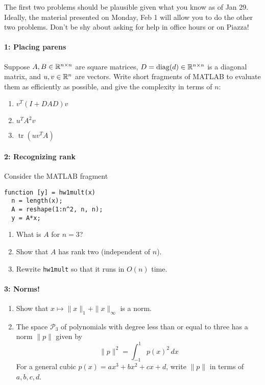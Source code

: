 \documentclass[12pt, leqno]{article}
\begin{document}

The first two problems should be plausible given what you know as of
Jan 29.  Ideally, the material presented on Monday, Feb 1 will allow
you to do the other two problems.  Don't be shy about asking for help
in office hours or on Piazza!

\paragraph*{1: Placing parens}
Suppose $A, B \in \mathbb{R}^{n \times n}$ are square matrices,
$D = \operatorname{diag}(d) \in \mathbb{R}^{n \times n}$ is a diagonal matrix,
and $u, v \in \mathbb{R}^n$ are vectors.  Write short
fragments of MATLAB to evaluate them as efficiently
as possible, and give the complexity in terms of $n$:
\begin{enumerate}
\item $v^T (I + D A D) v$
\item $u^T A^2 v$
\item $\operatorname{tr}(uv^T A)$
\end{enumerate}

\paragraph*{2: Recognizing rank}
Consider the MATLAB fragment

\lstset{language=matlab,frame=lines,columns=flexible}
\begin{lstlisting}
function [y] = hw1mult(x)
  n = length(x);
  A = reshape(1:n^2, n, n);
  y = A*x;
\end{lstlisting}

\begin{enumerate}
\item What is $A$ for $n = 3$?
\item Show that $A$ has rank two (independent of $n$).
\item Rewrite {\tt hw1mult} so that it runs in $O(n)$ time.
\end{enumerate}

\paragraph*{3: Norms!}
\begin{enumerate}
\item
  Show that $x \mapsto \|x\|_1 + \|x\|_\infty$ is a norm.
\item
  The space $\mathcal{P}_3$ of polynomials with degree less than or
  equal to three has a norm $\|p\|$ given by
  \[
    \|p\|^2 = \int_{-1}^1 p(x)^2 \, dx
  \]
  For a general cubic $p(x) = ax^3 + bx^2 + cx + d$, write $\|p\|$
  in terms of $a, b, c, d$.
\end{enumerate}
\end{document}
